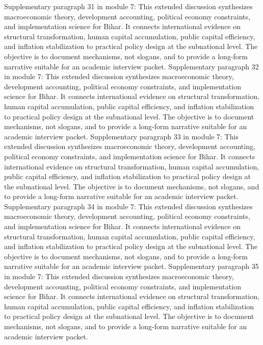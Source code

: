 \documentclass[preprint,12pt]{elsarticle}
\begin{document}
Supplementary paragraph 31 in module 7: This extended discussion synthesizes macroeconomic theory, development accounting, political economy constraints, and implementation science for Bihar. It connects international evidence on structural transformation, human capital accumulation, public capital efficiency, and inflation stabilization to practical policy design at the subnational level. The objective is to document mechanisms, not slogans, and to provide a long-form narrative suitable for an academic interview packet.
Supplementary paragraph 32 in module 7: This extended discussion synthesizes macroeconomic theory, development accounting, political economy constraints, and implementation science for Bihar. It connects international evidence on structural transformation, human capital accumulation, public capital efficiency, and inflation stabilization to practical policy design at the subnational level. The objective is to document mechanisms, not slogans, and to provide a long-form narrative suitable for an academic interview packet.
Supplementary paragraph 33 in module 7: This extended discussion synthesizes macroeconomic theory, development accounting, political economy constraints, and implementation science for Bihar. It connects international evidence on structural transformation, human capital accumulation, public capital efficiency, and inflation stabilization to practical policy design at the subnational level. The objective is to document mechanisms, not slogans, and to provide a long-form narrative suitable for an academic interview packet.
Supplementary paragraph 34 in module 7: This extended discussion synthesizes macroeconomic theory, development accounting, political economy constraints, and implementation science for Bihar. It connects international evidence on structural transformation, human capital accumulation, public capital efficiency, and inflation stabilization to practical policy design at the subnational level. The objective is to document mechanisms, not slogans, and to provide a long-form narrative suitable for an academic interview packet.
Supplementary paragraph 35 in module 7: This extended discussion synthesizes macroeconomic theory, development accounting, political economy constraints, and implementation science for Bihar. It connects international evidence on structural transformation, human capital accumulation, public capital efficiency, and inflation stabilization to practical policy design at the subnational level. The objective is to document mechanisms, not slogans, and to provide a long-form narrative suitable for an academic interview packet.
\end{document}
